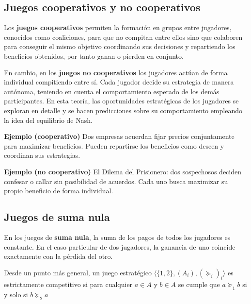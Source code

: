 \documentclass[12pt,a4paper,]{book}
\numberwithin{dummy}{section}
\theoremstyle{ocrenumbox}
\theoremstyle{blacknumex}
\theoremstyle{blacknumbox}
\theoremstyle{ocrenum}
\theoremstyle{ocrenum}
\begin{document}
\subsection{Juegos cooperativos y no
cooperativos}\label{juegos-cooperativos-y-no-cooperativos}

Los \textbf{juegos cooperativos} permiten la formación en grupos entre
jugadores, conocidos como coaliciones, para que no compitan entre ellos
sino que colaboren para conseguir el mismo objetivo coordinando sus
decisiones y repartiendo los beneficios obtenidos, por tanto ganan o
pierden en conjunto.

En cambio, en los \textbf{juegos no cooperativos} los jugadores actúan
de forma individual compitiendo entre sí. Cada jugador decide su
estrategia de manera autónoma, teniendo en cuenta el comportamiento
esperado de los demás participantes. En esta teoría, las oportunidades
estratégicas de los jugadores se exploran en detalle y se hacen
predicciones sobre su comportamiento empleando la idea del equilibrio de
Nash.

\begin{tcolorbox}[colback=blue!10] 
\textbf{Ejemplo (cooperativo)}
Dos empresas acuerdan fijar precios conjuntamente para maximizar beneficios.  
Pueden repartirse los beneficios como deseen y coordinan sus estrategias.
\end{tcolorbox}

\begin{tcolorbox}[colback=blue!10] 
\textbf{Ejemplo (no cooperativo)}
El Dilema del Prisionero: dos sospechosos deciden confesar o callar sin posibilidad de acuerdos.  
Cada uno busca maximizar su propio beneficio de forma individual.
\end{tcolorbox}

\subsection{Juegos de suma nula}\label{juegos-de-suma-nula}

En los juegos de \textbf{suma nula}, la suma de los pagos de todos los
jugadores es constante. En el caso particular de dos jugadores, la
ganancia de uno coincide exactamente con la pérdida del otro.

Desde un punto más general, un juego estratégico
\(\langle \{1,2\}, (A_i), (\succeq_i)_i \rangle\) es estrictamente
competitivo si para cualquier \(a \in A\) y \(b \in A\) se cumple que
\(a \succeq_1 b\) si y solo si \(b \succeq_2 a\)
\end{document}
